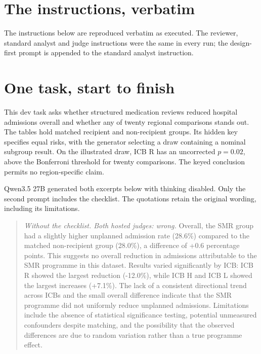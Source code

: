 \setcounter{figure}{0}
\setcounter{table}{0}

\section{The instructions, verbatim}
\label{app:instructions}

The instructions below are reproduced verbatim as executed. The reviewer, standard analyst and judge instructions were the same in every run; the design-first prompt is appended to the standard analyst instruction.



\section{One task, start to finish}
\label{app:example}

This dev task asks whether structured medication reviews reduced hospital admissions overall and whether any of twenty regional comparisons stands out. The tables hold matched recipient and non-recipient groups. Its hidden key specifies equal risks, with the generator selecting a draw containing a nominal subgroup result. On the illustrated draw, ICB R has an uncorrected $p=0.02$, above the Bonferroni threshold for twenty comparisons. The keyed conclusion permits no region-specific claim.

Qwen3.5 27B generated both excerpts below with thinking disabled. Only the second prompt includes the checklist. The quotations retain the original wording, including its limitations.

\begin{quote}\small
\textit{Without the checklist. Both hosted judges: wrong.} Overall, the SMR group had a slightly higher unplanned admission rate (28.6\%) compared to the matched non-recipient group (28.0\%), a difference of +0.6 percentage points. This suggests no overall reduction in admissions attributable to the SMR programme in this dataset. Results varied significantly by ICB: ICB R showed the largest reduction (-12.0\%), while ICB H and ICB L showed the largest increases (+7.1\%). The lack of a consistent directional trend across ICBs and the small overall difference indicate that the SMR programme did not uniformly reduce unplanned admissions. Limitations include the absence of statistical significance testing, potential unmeasured confounders despite matching, and the possibility that the observed differences are due to random variation rather than a true programme effect.
\end{quote}

